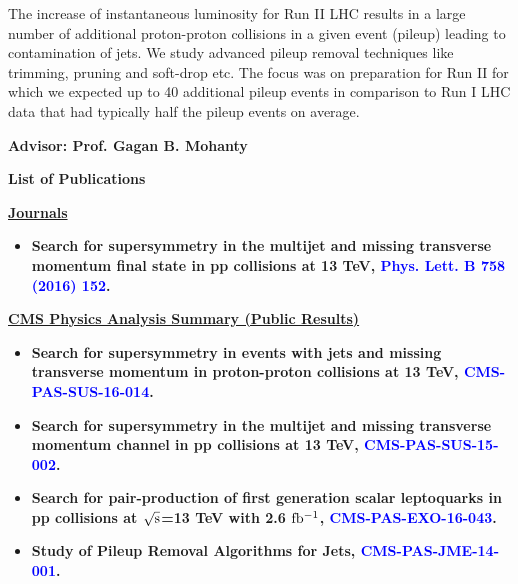 \begin{titlepage}
The increase of instantaneous luminosity for Run II LHC results in a large number of additional proton-proton collisions in a given event (pileup) leading to contamination of jets. We study advanced pileup removal techniques like trimming, pruning and soft-drop  etc. The focus was on preparation for Run II for which we expected up to 40 additional pileup events in comparison to Run I LHC data that had typically half the pileup events on average.



\vspace{1cm}

\begin{center}
{\bf Advisor: Prof. Gagan B. Mohanty}
\end{center}


\newpage

\bf{\LARGE List of Publications}

\vspace{2cm}
\underline{\bf \Large{Journals}}

\begin{itemize}

\item {\bf  Search for supersymmetry in the multijet and missing transverse momentum final state in pp collisions at 13 TeV, \textcolor{blue}{Phys. Lett. B 758 (2016) 152}.}

\end{itemize}
\vspace{0.5cm}
\underline{\bf \Large{CMS Physics Analysis Summary (Public Results)}}

\begin{itemize}
\item {\bf Search for supersymmetry in events with jets and missing
transverse momentum in proton-proton collisions at 13 TeV, \textcolor{blue}{CMS-PAS-SUS-16-014}.}

\item{\bf Search for supersymmetry in the multijet and missing transverse momentum channel in pp collisions at 13 TeV, \textcolor{blue}{CMS-PAS-SUS-15-002}. }

\item{\bf Search for pair-production of first generation scalar leptoquarks in pp collisions at $\rm \sqrt{s}$=13 TeV with 2.6 $\rm fb^{-1}$, \textcolor{blue}{CMS-PAS-EXO-16-043}. }

\item{\bf Study of Pileup Removal Algorithms for Jets, \textcolor{blue}{CMS-PAS-JME-14-001}.}


\end{itemize}
\end{titlepage}
